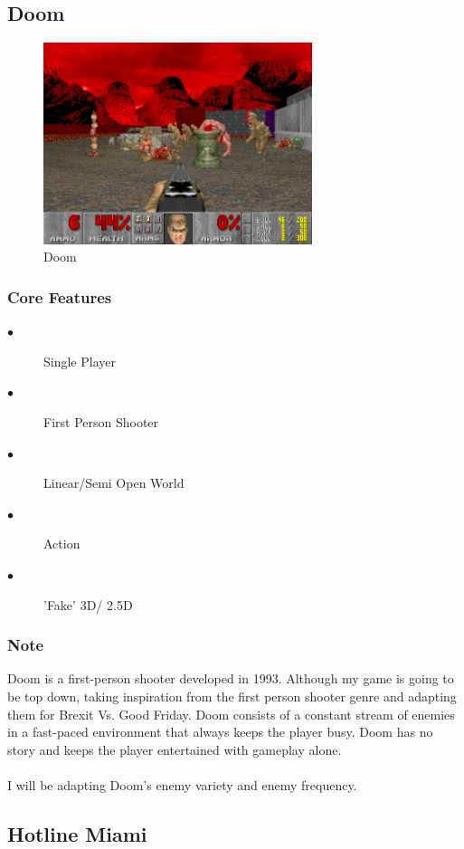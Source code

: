 \documentclass[a4paper]{scrreprt}
\begin{document}
\subsection{Doom}

\begin{figure}[H]
\centering
\includegraphics[width=0.70\textwidth]{doom.png}
\caption{\label{fig:art} Doom}
\end{figure}

\subsubsection{Core Features}
\begin{description}
\item[$\bullet$] Single Player
\item[$\bullet$] First Person Shooter
\item[$\bullet$] Linear/Semi Open World
\item[$\bullet$] Action
\item[$\bullet$] 'Fake' 3D/ 2.5D
\end{description}

\subsubsection{Note}
Doom is a first-person shooter developed in 1993. 
Although my game is going to be top down, taking inspiration from the first person shooter genre and adapting them for Brexit Vs. Good Friday.
Doom consists of a constant stream of enemies in a fast-paced environment that always keeps the player busy.
Doom has no story and keeps the player entertained with gameplay alone. \\\\
I will be adapting Doom's enemy variety and enemy frequency.

\subsection{Hotline Miami}
\end{document}
